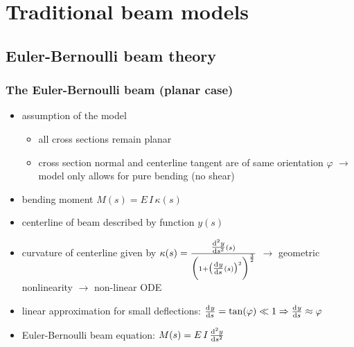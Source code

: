 \section{Traditional beam models}

\subsection{Euler-Bernoulli beam theory}

\begin{frame}
  \frametitle{The Euler-Bernoulli beam (planar case)}
  
  \begin{itemize}
    \item assumption of the model
      \begin{itemize}
        \item all cross sections remain planar
        \item cross section normal and centerline tangent are of same orientation $\varphi$ \newline
          \null \quad $\rightarrow$ model only allows for pure bending (no shear)
      \end{itemize}
    \item bending moment $M(s) = E \, I \, \kappa(s)$
    \item centerline of beam described by function $y(s)$
    \item curvature of centerline given by $\kappa(s) = \frac{\od[2]{y}{s}(s)}{\biggl( 1 + \bigl( \od{y}{s}(s) \bigr)^2 \biggr)^{\frac{3}{2}}}$ \newline
      \null \quad $\rightarrow$ geometric nonlinearity $\rightarrow$ non-linear ODE
    \item linear approximation for small deflections: $\od{y}{s} = \tan(\varphi) \ll 1 \Rightarrow \od{y}{s} \approx \varphi$
    \item Euler-Bernoulli beam equation: $M(s) = E \, I \, \od[2]{y}{s}$
  \end{itemize}
\end{frame}


